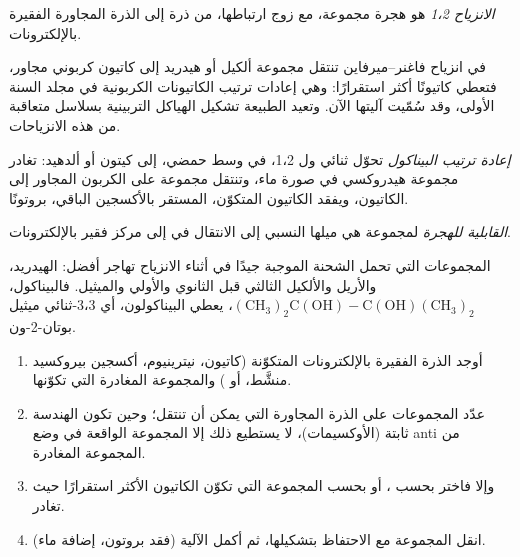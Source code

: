 \begin{definition}[الانزياح 1،2]\label{def:b3:radicals-carbenes:shift}
\emph{الانزياح 1،2} هو هجرة مجموعة، مع زوج
ارتباطها، من ذرة إلى الذرة المجاورة الفقيرة بالإلكترونات.
\end{definition}

في انزياح فاغنر--ميرفاين تنتقل مجموعة ألكيل أو هيدريد إلى كاتيون كربوني
مجاور، فتعطي كاتيونًا أكثر استقرارًا: وهي إعادات ترتيب الكاتيونات الكربونية في
مجلد السنة الأولى، وقد سُمّيت آليتها الآن. وتعيد الطبيعة تشكيل الهياكل التربينية
بسلاسل متعاقبة من هذه الانزياحات.

\begin{definition}\label{def:b3:radicals-carbenes:pinacol}
\emph{إعادة ترتيب البيناكول} تحوّل ثنائي ول 1،2،
في وسط حمضي، إلى كيتون أو ألدهيد: تغادر مجموعة هيدروكسي في صورة ماء،
وتنتقل مجموعة على الكربون المجاور إلى الكاتيون، ويفقد الكاتيون المتكوّن،
المستقر بالأكسجين الباقي، بروتونًا.
\end{definition}

\begin{definition}\label{def:b3:radicals-carbenes:migratory}
\emph{القابلية للهجرة} لمجموعة هي ميلها
النسبي إلى الانتقال في  إلى مركز فقير بالإلكترونات.
\end{definition}

المجموعات التي تحمل الشحنة الموجبة جيدًا في أثناء الانزياح تهاجر أفضل: الهيدريد،
والأريل والألكيل الثالثي قبل الثانوي والأولي والميثيل. فالبيناكول،
$\mathrm{(CH_3)_2C(OH){-}C(OH)(CH_3)_2}$، يعطي البيناكولون، أي 3،3-ثنائي ميثيل بوتان-2-ون.

\begin{method}\label{met:b3:radicals-carbenes:rearrangement}
\begin{enumerate}
  \item أوجد الذرة الفقيرة بالإلكترونات المتكوّنة (كاتيون، نيترينيوم، أكسجين
        بيروكسيد منشَّط،  أو ) والمجموعة المغادرة التي
        تكوّنها.
  \item عدّد المجموعات على الذرة المجاورة التي يمكن أن تنتقل؛ وحين تكون
        الهندسة ثابتة (الأوكسيمات)، لا يستطيع ذلك إلا المجموعة الواقعة في وضع anti من المجموعة المغادرة.
  \item وإلا فاختر بحسب ، أو بحسب المجموعة التي تكوّن الكاتيون الأكثر
        استقرارًا حيث تغادر.
  \item انقل المجموعة مع الاحتفاظ بتشكيلها، ثم أكمل
        الآلية (فقد بروتون، إضافة ماء).
\end{enumerate}
\end{method}

